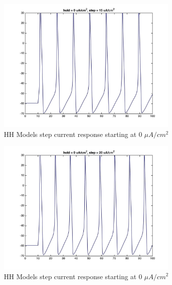 \documentclass{beamer}
\begin{document}
\begin{frame}
  \begin{figure}
    \centering
    \includegraphics[width = 0.8\textwidth]{./images/current_0_15.jpg}
    \caption{HH Models step current response starting at 0 $\mu A/cm^2$}
  \end{figure}
\end{frame}


\begin{frame}
  \begin{figure}
    \centering
    \includegraphics[width = 0.8\textwidth]{./images/current_0_20.jpg}
    \caption{HH Models step current response starting at 0 $\mu A/cm^2$}
  \end{figure}
\end{frame}
\end{document}
